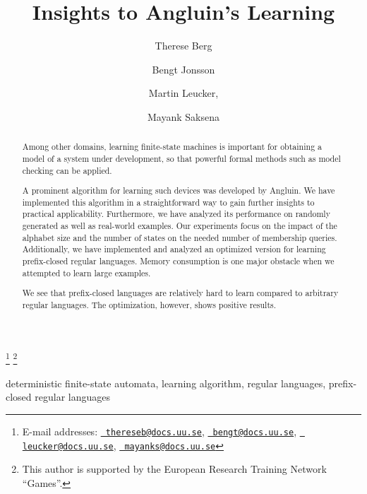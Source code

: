 \def\lastname{Berg, Jonsson, Leucker, Saksena}
\begin{frontmatter}
  \title{Insights to Angluin's Learning} 
	\author{Therese Berg} 
	\author{Bengt Jonsson} 
	\author{Martin Leucker,} 
	\author{Mayank Saksena}
  \address{Department of Computer Systems\\ Uppsala University\\
    Uppsala, Sweden} \thanks[thereseb]{E-mail addresses:
    \href{mailto:thereseb@docs.uu.se} {\texttt{\normalshape
        thereseb@docs.uu.se}}, 
    \href{mailto:bengt@docs.uu.se} {\texttt{\normalshape
        bengt@docs.uu.se}},
    \href{mailto:leucker@docs.uu.se} {\texttt{\normalshape
        leucker@docs.uu.se}},
    \href{mailto:mayanks@docs.uu.se} {\texttt{\normalshape
        mayanks@docs.uu.se}}}
  \thanks[martin]{This author is supported by the 
   European Research Training Network ``Games''.}
\begin{abstract} 
Among other domains, learning finite-state machines is important for
obtaining a model of a system under development, so that powerful
formal methods such as model checking can be applied.
  
A prominent algorithm for learning such devices was developed by
Angluin. We have implemented this algorithm in a straightforward way
to gain further insights to practical applicability. Furthermore, we
have analyzed its performance on randomly generated as well as
real-world examples. Our experiments focus on the impact of the
alphabet size and the number of states on the needed number of
membership queries. Additionally, we have implemented and analyzed an
optimized version for learning prefix-closed regular languages.
Memory consumption is one major obstacle when we attempted to learn
large examples.
  
We see that prefix-closed languages are relatively hard to learn
compared to arbitrary regular languages. The optimization, however,
shows positive results.

\end{abstract}
\begin{keyword}
  deterministic finite-state automata, learning algorithm, regular languages,
prefix-closed regular languages
\end{keyword}
\end{frontmatter}


